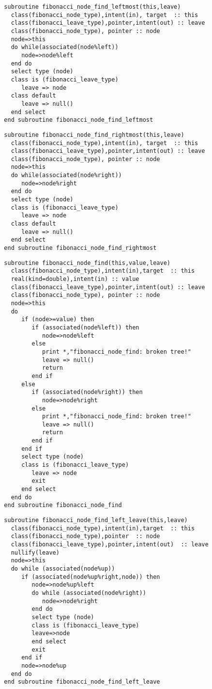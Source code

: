 \begin{Verbatim}
  subroutine fibonacci_node_find_leftmost(this,leave)
    class(fibonacci_node_type),intent(in), target  :: this
    class(fibonacci_leave_type),pointer,intent(out) :: leave
    class(fibonacci_node_type), pointer :: node
    node=>this
    do while(associated(node%left))
       node=>node%left
    end do
    select type (node)
    class is (fibonacci_leave_type)
       leave => node
    class default
       leave => null()
    end select
  end subroutine fibonacci_node_find_leftmost
\end{Verbatim}

\begin{Verbatim}
  subroutine fibonacci_node_find_rightmost(this,leave)
    class(fibonacci_node_type),intent(in), target  :: this
    class(fibonacci_leave_type),pointer,intent(out) :: leave
    class(fibonacci_node_type), pointer :: node
    node=>this
    do while(associated(node%right))
       node=>node%right
    end do
    select type (node)
    class is (fibonacci_leave_type)
       leave => node
    class default
       leave => null()
    end select
  end subroutine fibonacci_node_find_rightmost
\end{Verbatim}

\begin{Verbatim}
  subroutine fibonacci_node_find(this,value,leave)
    class(fibonacci_node_type),intent(in),target  :: this
    real(kind=double),intent(in) :: value
    class(fibonacci_leave_type),pointer,intent(out) :: leave
    class(fibonacci_node_type), pointer :: node
    node=>this
    do
       if (node>=value) then
          if (associated(node%left)) then
             node=>node%left
          else
             print *,"fibonacci_node_find: broken tree!"
             leave => null()
             return
          end if
       else
          if (associated(node%right)) then
             node=>node%right
          else
             print *,"fibonacci_node_find: broken tree!"
             leave => null()
             return
          end if
       end if
       select type (node)
       class is (fibonacci_leave_type)
          leave => node
          exit
       end select
    end do
  end subroutine fibonacci_node_find
\end{Verbatim}

\begin{Verbatim}
  subroutine fibonacci_node_find_left_leave(this,leave)
    class(fibonacci_node_type),intent(in),target  :: this
    class(fibonacci_node_type),pointer  :: node
    class(fibonacci_leave_type),pointer,intent(out)  :: leave
    nullify(leave)
    node=>this
    do while (associated(node%up))
       if (associated(node%up%right,node)) then
          node=>node%up%left
          do while (associated(node%right))
             node=>node%right
          end do
          select type (node)
          class is (fibonacci_leave_type)
          leave=>node
          end select
          exit
       end if
       node=>node%up
    end do
  end subroutine fibonacci_node_find_left_leave
\end{Verbatim}

